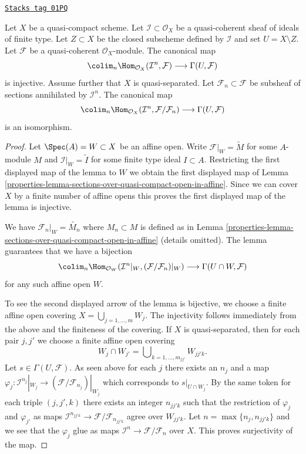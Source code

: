 \begin{lemma}
\label{properties-lemma-sections-over-quasi-compact-open}
\href{https://stacks.math.columbia.edu/tag/01PQ}{\texttt{Stacks tag 01PQ}}

Let $X$ be a quasi-compact scheme.
Let $\mathcal{I} \subset \mathcal{O}_X$ be a
quasi-coherent sheaf of ideals of finite type.
Let $Z \subset X$ be the closed subscheme
defined by $\mathcal{I}$ and set $U = X \setminus Z$.
Let $\mathcal{F}$ be a quasi-coherent $\mathcal{O}_X$-module.
The canonical map
$$
\colim_n \Hom_{\mathcal{O}_X}(\mathcal{I}^n,
\mathcal{F})
\longrightarrow
\Gamma(U, \mathcal{F})
$$
is injective. Assume further that $X$ is quasi-separated.
Let $\mathcal{F}_n \subset \mathcal{F}$
be subsheaf of sections annihilated by $\mathcal{I}^n$.
The canonical map
$$
\colim_n \Hom_{\mathcal{O}_X}(\mathcal{I}^n,
\mathcal{F}/\mathcal{F}_n)
\longrightarrow
\Gamma(U, \mathcal{F})
$$
is an isomorphism.
\end{lemma}

\begin{proof}

Let $\Spec(A) = W \subset X$ be an affine open. Write
$\mathcal{F}|_W = \widetilde{M}$ for some $A$-module $M$
and $\mathcal{I}|_W = \widetilde{I}$ for some finite type
ideal $I \subset A$. Restricting the first displayed map
of the lemma to $W$ we obtain the first displayed map of
Lemma \ref{properties-lemma-sections-over-quasi-compact-open-in-affine}.
Since we can cover $X$ by a finite number of affine opens this
proves the first displayed map of the lemma is injective.

\medskip\noindent
We have $\mathcal{F}_n|_W = \widetilde{M_n}$ where
$M_n \subset M$ is defined as in
Lemma \ref{properties-lemma-sections-over-quasi-compact-open-in-affine}
(details omitted). The lemma guarantees that we have a bijection
$$
\colim_n  \Hom_{\mathcal{O}_W}(
\mathcal{I}^n|_W, (\mathcal{F}/\mathcal{F}_n)|_W)
\longrightarrow
\Gamma(U \cap W, \mathcal{F})
$$
for any such affine open $W$.

\medskip\noindent
To see the second displayed arrow of the lemma is bijective,
we choose a finite affine open covering $X = \bigcup_{j = 1, \ldots, m} W_j$.
The injectivity follows immediately from the above and the finiteness of
the covering. If $X$ is quasi-separated, then for each pair
$j, j'$ we choose a finite affine open covering
$$
W_j \cap W_{j'} = \bigcup\nolimits_{k = 1, \ldots, m_{jj'}} W_{jj'k}.
$$
Let $s \in \Gamma(U, \mathcal{F})$. As seen above for each $j$ there exists
an $n_j$ and a map
$\varphi_j : \mathcal{I}^{n_j}|_{W_j} \to
(\mathcal{F}/\mathcal{F}_{n_j})|_{W_j}$
which corresponds to $s|_{U \cap W_j}$.
By the same token for each triple $(j, j', k)$ there exists an integer
$n_{jj'k}$ such that the restriction of $\varphi_j$ and $\varphi_{j'}$
as maps $\mathcal{I}^{n_{jj'k}} \to \mathcal{F}/\mathcal{F}_{n_{jj'k}}$
agree over $W_{jj'k}$. Let $n = \max\{n_j, n_{jj'k}\}$ and we see that
the $\varphi_j$ glue as maps
$\mathcal{I}^n \to \mathcal{F}/\mathcal{F}_n$ over $X$.
This proves surjectivity of the map.
\end{proof}

